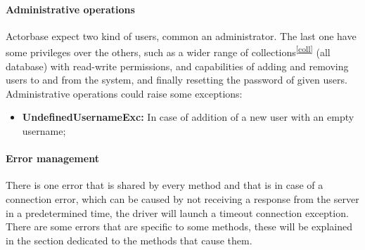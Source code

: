 \documentclass{scalatekids-article}
\begin{document}
\paragraph{Administrative operations}

Actorbase expect two kind of users, common an administrator. The last one have
some privileges over the others, such as a wider range of collections\textsuperscript{\ref{coll}} (all
database) with read-write permissions, and capabilities of adding and removing
users to and from the system, and finally resetting the password of given users.
Administrative operations could raise some exceptions:
\begin{itemize}
\item \textbf{UndefinedUsernameExc:} In case of addition of a new user with an empty username;
\end{itemize}
\paragraph{Error management}

There is one error that is shared by every method and that is in case of a
connection error, which can be caused by not receiving a response from the
server in a predetermined time, the driver will launch a timeout connection
exception. There are some errors that are specific to some methods, these will
be explained in the section dedicated to the methods that cause them.

\end{document}
